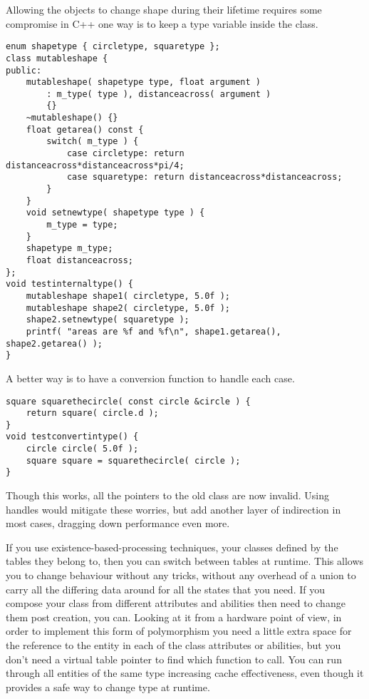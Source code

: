 Allowing the objects to change shape during their lifetime requires some
compromise in C++ one way is to keep a type variable inside the class.

\begin{lstlisting}[caption=ugly internal type code]
enum shapetype { circletype, squaretype };
class mutableshape {
public:
	mutableshape( shapetype type, float argument )
		: m_type( type ), distanceacross( argument )
		{}
	~mutableshape() {}
	float getarea() const {
		switch( m_type ) {
			case circletype: return distanceacross*distanceacross*pi/4;
			case squaretype: return distanceacross*distanceacross;
		}
	}
	void setnewtype( shapetype type ) {
		m_type = type;
	}
	shapetype m_type;
	float distanceacross;
};
void testinternaltype() {
	mutableshape shape1( circletype, 5.0f );
	mutableshape shape2( circletype, 5.0f );
	shape2.setnewtype( squaretype );
	printf( "areas are %f and %f\n", shape1.getarea(), shape2.getarea() );
}
\end{lstlisting}

A better way is to have a conversion function to handle each case.

\begin{lstlisting}[caption=convert existing class to new class]
square squarethecircle( const circle &circle ) {
	return square( circle.d );
}
void testconvertintype() {
	circle circle( 5.0f );
	square square = squarethecircle( circle );
}
\end{lstlisting}

Though this works, all the pointers to the old class are now invalid. Using
handles would mitigate these worries, but add another layer of indirection in
most cases, dragging down performance even more.

If you use existence-based-processing techniques, your classes defined by the
tables they belong to, then you can switch between tables at runtime. This
allows you to change behaviour without any tricks, without any overhead of a
union to carry all the differing data around for all the states that you need.
If you compose your class from different attributes and abilities then need to
change them post creation, you can. Looking at it from a hardware point of
view, in order to implement this form of polymorphism you need a little extra
space for the reference to the entity in each of the class attributes or
abilities, but you don't need a virtual table pointer to find which function to
call. You can run through all entities of the same type increasing cache
effectiveness, even though it provides a safe way to change type at runtime.

